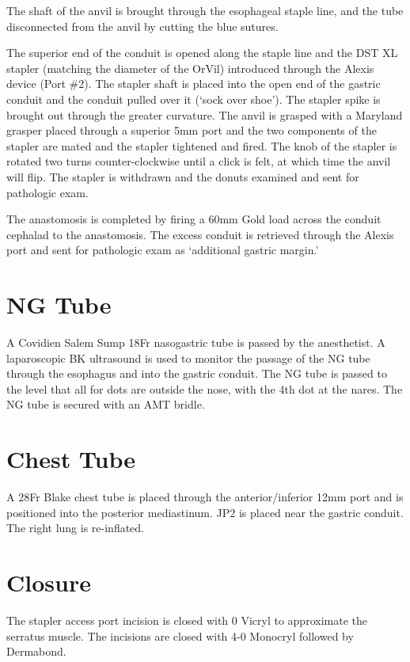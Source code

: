 \documentclass[
  letterpaper,
]{scrbook}
\begin{document}
The shaft of the anvil is brought through the esophageal staple line,
and the tube disconnected from the anvil by cutting the blue sutures.

The superior end of the conduit is opened along the staple line and the
DST XL stapler (matching the diameter of the OrVil) introduced through
the Alexis device (Port \#2). The stapler shaft is placed into the open
end of the gastric conduit and the conduit pulled over it (`sock over
shoe'). The stapler spike is brought out through the greater curvature.
The anvil is grasped with a Maryland grasper placed through a superior
5mm port and the two components of the stapler are mated and the stapler
tightened and fired. The knob of the stapler is rotated two turns
counter-clockwise until a click is felt, at which time the anvil will
flip. The stapler is withdrawn and the donuts examined and sent for
pathologic exam.

The anastomosis is completed by firing a 60mm Gold load across the
conduit cephalad to the anastomosis. The excess conduit is retrieved
through the Alexis port and sent for pathologic exam as `additional
gastric margin.'

\section{NG Tube}\label{ng-tube-1}

A Covidien Salem Sump 18Fr nasogastric tube is passed by the
anesthetist. A laparoscopic BK ultrasound is used to monitor the passage
of the NG tube through the esophagus and into the gastric conduit. The
NG tube is passed to the level that all for dots are outside the nose,
with the 4th dot at the nares. The NG tube is secured with an AMT
bridle.

\section{Chest Tube}\label{chest-tube}

A 28Fr Blake chest tube is placed through the anterior/inferior 12mm
port and is positioned into the posterior mediastinum. JP2 is placed
near the gastric conduit. The right lung is re-inflated.

\section{Closure}\label{closure-3}

The stapler access port incision is closed with 0 Vicryl to approximate
the serratus muscle. The incisions are closed with 4-0 Monocryl followed
by Dermabond.
\end{document}
